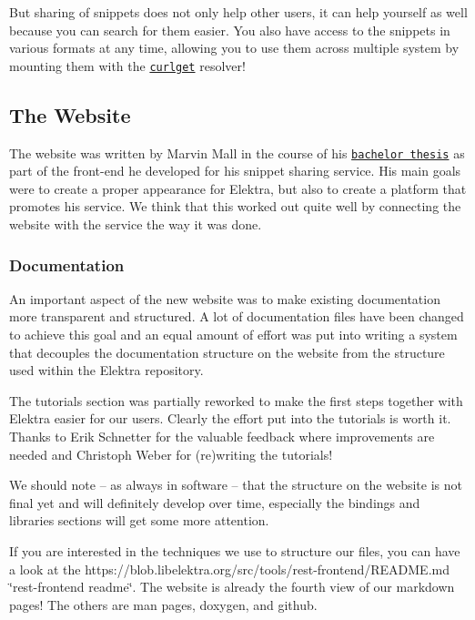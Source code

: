 But sharing of snippets does not only help other users, it can help yourself as well because you can search for them easier. You also have access to the snippets in various formats at any time, allowing you to use them across multiple system by mounting them with the \href{https://master.libelektra.org/src/plugins/curlget}{\tt curlget} resolver!

\subsection*{The Website}

The website was written by Marvin Mall in the course of his \href{https://www.libelektra.org/ftp/elektra/mall2016rest.pdf}{\tt bachelor thesis} as part of the front-\/end he developed for his snippet sharing service. His main goals were to create a proper appearance for Elektra, but also to create a platform that promotes his service. We think that this worked out quite well by connecting the website with the service the way it was done.

\subsubsection*{Documentation}

An important aspect of the new website was to make existing documentation more transparent and structured. A lot of documentation files have been changed to achieve this goal and an equal amount of effort was put into writing a system that decouples the documentation structure on the website from the structure used within the Elektra repository.

The tutorials section was partially reworked to make the first steps together with Elektra easier for our users. Clearly the effort put into the tutorials is worth it. Thanks to Erik Schnetter for the valuable feedback where improvements are needed and Christoph Weber for (re)writing the tutorials!

We should note -- as always in software -- that the structure on the website is not final yet and will definitely develop over time, especially the bindings and libraries sections will get some more attention.

If you are interested in the techniques we use to structure our files, you can have a look at the https\+://blob.libelektra.\+org/src/tools/rest-\/frontend/\+R\+E\+A\+D\+ME.md \char`\"{}rest-\/frontend readme\char`\"{}. The website is already the fourth view of our markdown pages! The others are man pages, doxygen, and github.

